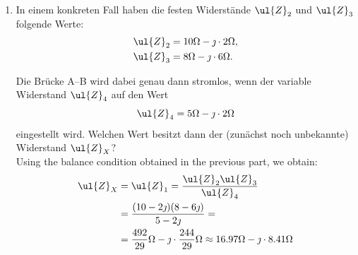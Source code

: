 \begin{ejercicio}[Wechselstrommessbrücke]
\begin{enumerate}
        We should denote that we can divide by $\ul{U}_{AD}$ because if $\ul{U}_{AD}=0$, then $\ul{U}_{BD}=\ul{U}_{AD}=0$ and therefore $\ul{I}_2 = \ul{I}_4 = 0$, which according to the Kirchhoff's Intensity Law implies that $\ul{I}=0$, which would mean that $\ul{U}=0$, which is not the case.

        Therefore, we have the balance condition:
        \begin{equation*}
            \dfrac{\ul{Z}_1}{\ul{Z}_2} = \dfrac{\ul{Z}_3}{\ul{Z}_4} \Longrightarrow \ul{Z}_1\ul{Z}_4 = \ul{Z}_2 \ul{Z}_3
        \end{equation*}


        \item In einem konkreten Fall haben die festen Widerstände $\ul{Z}_2$ und $\ul{Z}_3$ folgende Werte:
        \begin{align*}
            \ul{Z}_2 &= 10\Omega - \jmath \cdot 2\Omega, \\
            \ul{Z}_3 &= 8\Omega - \jmath \cdot 6\Omega.
        \end{align*}

        Die Brücke A–B wird dabei genau dann stromlos, wenn der variable Widerstand $\ul{Z}_4$ auf den Wert
        \begin{equation*}
            \ul{Z}_4 = 5\Omega - \jmath \cdot 2\Omega
        \end{equation*}
        eingestellt wird. Welchen Wert besitzt dann der (zunächst noch unbekannte) Widerstand $\ul{Z}_X$?\\

        Using the balance condition obtained in the previous part, we obtain:
        \begin{align*}
            \ul{Z}_X &= \ul{Z}_1 = \dfrac{\ul{Z}_2 \ul{Z}_3}{\ul{Z}_4} \\
            &= \dfrac{(10 - 2\jmath)(8-6\jmath)}{5-2\jmath}
            =\\&= \dfrac{492}{29}\Omega - \jmath \cdot \dfrac{244}{29}\Omega
            \approx 16.97 \Omega - \jmath \cdot 8.41 \Omega
        \end{align*}
    \end{enumerate}
    
\end{ejercicio}



